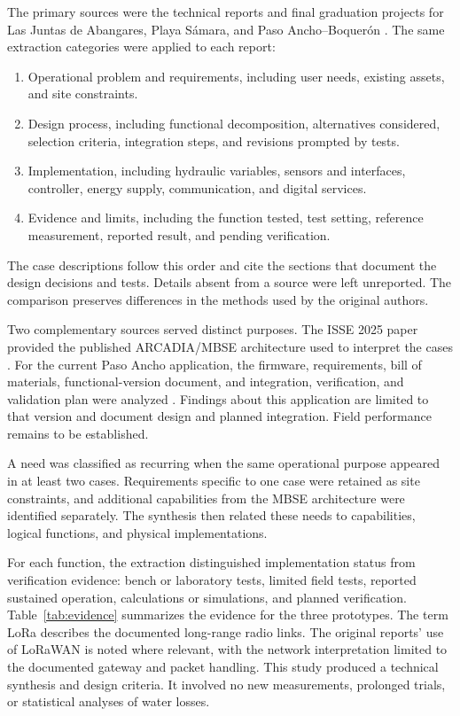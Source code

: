\documentclass[conference]{IEEEtran}
\begin{document}
The primary sources were the technical reports and final graduation projects for Las Juntas de Abangares, Playa S\'{a}mara, and Paso Ancho--Boquer\'{o}n \cite{chavarria2021implementacion,solorzano2021sistema,oviedo2024desarrollo}. The same extraction categories were applied to each report:
\begin{enumerate}
\item Operational problem and requirements, including user needs, existing assets, and site constraints.
\item Design process, including functional decomposition, alternatives considered, selection criteria, integration steps, and revisions prompted by tests.
\item Implementation, including hydraulic variables, sensors and interfaces, controller, energy supply, communication, and digital services.
\item Evidence and limits, including the function tested, test setting, reference measurement, reported result, and pending verification.
\end{enumerate}
The case descriptions follow this order and cite the sections that document the design decisions and tests. Details absent from a source were left unreported. The comparison preserves differences in the methods used by the original authors.

Two complementary sources served distinct purposes. The ISSE 2025 paper provided the published ARCADIA/MBSE architecture used to interpret the cases \cite{arguedas2025towards}. For the current Paso Ancho application, the firmware, requirements, bill of materials, functional-version document, and integration, verification, and validation plan were analyzed \cite{deltalabo2026repo}. Findings about this application are limited to that version and document design and planned integration. Field performance remains to be established.

A need was classified as recurring when the same operational purpose appeared in at least two cases. Requirements specific to one case were retained as site constraints, and additional capabilities from the MBSE architecture were identified separately. The synthesis then related these needs to capabilities, logical functions, and physical implementations.

For each function, the extraction distinguished implementation status from verification evidence: bench or laboratory tests, limited field tests, reported sustained operation, calculations or simulations, and planned verification. Table~\ref{tab:evidence} summarizes the evidence for the three prototypes. The term LoRa describes the documented long-range radio links. The original reports' use of LoRaWAN is noted where relevant, with the network interpretation limited to the documented gateway and packet handling. This study produced a technical synthesis and design criteria. It involved no new measurements, prolonged trials, or statistical analyses of water losses.
\end{document}
